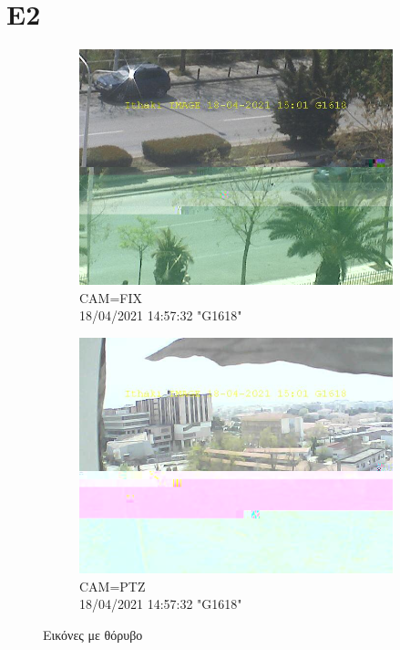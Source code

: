 \documentclass[hidelinks, 12pt, a4paper]{article}
\begin{document}
\section{E2}

\begin{figure}[h!]
     \begin{subfigure}[b]{0.5\textwidth}
         \centering
         \includegraphics[keepaspectratio, width=\textwidth]{image_with_errors_fix.jpg}
         \caption{CAM=FIX \\ 18/04/2021 14:57:32 "G1618"}
     \end{subfigure}
     \hfill
     \begin{subfigure}[b]{0.5\textwidth}
         \centering
         \includegraphics[keepaspectratio, width=\textwidth]{image_with_errors_ptz.jpg}
         \caption{CAM=PTZ \\ 18/04/2021 14:57:32 "G1618"}
     \end{subfigure}
     \caption{Εικόνες με θόρυβο}
\end{figure}
\end{document}
